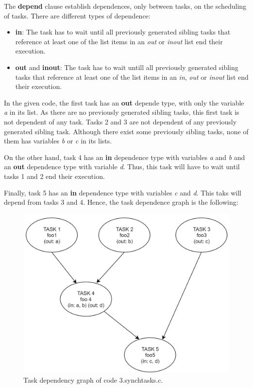 \documentclass[12pt, a4paper]{article}
\begin{document}
The \textbf{depend} clause establish dependences, only between tasks, on the scheduling of tasks. There are different types of dependence:

\begin{itemize}
	\item \textbf{in}: The task has to wait until all previously generated sibling tasks that reference at least one of the list items in an \textit{out} or \textit{inout} list end their execution.
	\item \textbf{out} and \textbf{inout}: The task has to wait untill all previously generated sibling tasks that reference at least one of the list items in an \textit{in}, \textit{out} or \textit{inout} list end their execution.
\end{itemize}

In the given code, the first task has an \textbf{out} depende type, with only the variable \textit{a} in its list. As there are no previously generated sibling tasks, this first task is not dependent of any task. Tasks 2 and 3 are not dependent of any previously generated sibling task. Although there exist some previously sibling tasks, none of them has variables \textit{b} or \textit{c} in its lists.

On the other hand, task 4 has an \textbf{in} dependence type with variables \textit{a} and \textit{b} and an \textbf{out} dependence type with variable \textit{d}. Thus, this task will have to wait until tasks 1 and 2 end their execution.

Finally, task 5 has an \textbf{in} dependence type with variables \textit{c} and \textit{d}. This taks will depend from tasks 3 and 4. Hence, the task dependence graph is the following:

\begin{figure}[H]
  \centering
  \includegraphics[scale=0.5]{./images/synchtasks}
  \caption{Task dependency graph of code 3.synchtasks.c.}
  \label{Task dependency graph of code 3.synchtasks.c.}
\end{figure}
\end{document}
